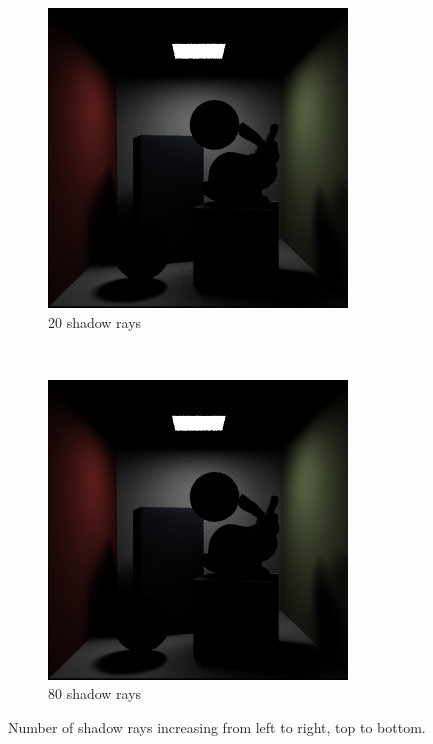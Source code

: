 \documentclass[a4paper, 12pt]{report}
\begin{document}
\begin{figure}
	\begin{subfigure}[h]{0.5\textwidth}
                \includegraphics[width=\textwidth]{figures/shadowrays-20-10rpp.png}
                \caption{20 shadow rays}
                \label{fig:20sr}
        \end{subfigure}%
	~
	\begin{subfigure}[h]{0.5\textwidth}
                \includegraphics[width=\textwidth]{figures/shadowrays-80-10rpp.png}
                \caption{80 shadow rays}
                \label{fig:80sr}
        \end{subfigure}
        \caption{Number of shadow rays increasing from left to right, top to bottom.}\label{fig:shadow_rays}
\end{figure}
\end{document}
